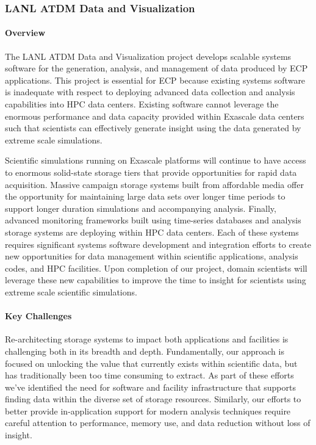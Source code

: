\subsubsection{ LANL ATDM Data and Visualization} 

\paragraph{Overview} 
The LANL ATDM Data and Visualization project develops scalable
systems software for the generation, analysis, and management of data
produced by ECP applications. This project is essential for ECP because
existing systems software is inadequate with respect to deploying advanced
data collection and analysis capabilities into HPC data centers. Existing
software cannot leverage the enormous performance and data capacity
provided within Exascale data centers such that scientists can effectively
generate insight using the data generated by extreme scale
simulations.

Scientific simulations running on Exascale platforms will
continue to have access to enormous solid-state storage tiers that provide 
opportunities for rapid data acquisition. Massive campaign storage
systems built from affordable media offer the opportunity for maintaining
large data sets over longer time periods to support longer duration
simulations and accompanying analysis. Finally, advanced monitoring frameworks
built using time-series databases and analysis storage systems are deploying
within HPC data centers. Each of these systems requires significant systems
software development and integration efforts to create new opportunities for data
management within scientific applications, analysis codes, and HPC
facilities. Upon completion of our project, domain scientists will
leverage these new capabilities to improve the
time to insight for scientists using extreme scale scientific simulations.

\paragraph{Key  Challenges}
Re-architecting storage systems to impact both applications and facilities is
challenging both in its breadth and depth. Fundamentally, our approach is
focused on unlocking the value that currently exists within scientific data,
but has traditionally been too time consuming to extract. As part of these
efforts we've identified the need for software and facility infrastructure
that supports finding data within the diverse set of storage resources.
Similarly, our efforts to better provide in-application support for modern
analysis techniques require careful attention to performance, memory use, and
data reduction without loss of insight. 

